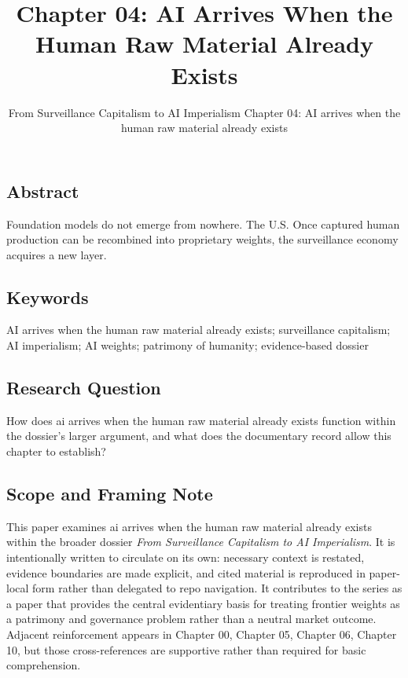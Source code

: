 \documentclass[
  american,
  11pt,
  letterpaper,
]{article}
\title{Chapter 04: AI Arrives When the Human Raw Material Already
Exists}
\subtitle{From Surveillance Capitalism to AI Imperialism \textbar{}
Chapter 04: AI arrives when the human raw material already exists}
\author{}
\date{}
\begin{document}
\maketitle

\subsection{Abstract}\label{abstract}

Foundation models do not emerge from nowhere. The U.S. Once captured
human production can be recombined into proprietary weights, the
surveillance economy acquires a new layer.

\subsection{Keywords}\label{keywords}

AI arrives when the human raw material already exists; surveillance
capitalism; AI imperialism; AI weights; patrimony of humanity;
evidence-based dossier

\subsection{Research Question}\label{research-question}

How does ai arrives when the human raw material already exists function
within the dossier's larger argument, and what does the documentary
record allow this chapter to establish?

\subsection{Scope and Framing Note}\label{scope-and-framing-note}

This paper examines ai arrives when the human raw material already
exists within the broader dossier \emph{From Surveillance Capitalism to
AI Imperialism}. It is intentionally written to circulate on its own:
necessary context is restated, evidence boundaries are made explicit,
and cited material is reproduced in paper-local form rather than
delegated to repo navigation. It contributes to the series as a paper
that provides the central evidentiary basis for treating frontier
weights as a patrimony and governance problem rather than a neutral
market outcome. Adjacent reinforcement appears in Chapter 00, Chapter
05, Chapter 06, Chapter 10, but those cross-references are supportive
rather than required for basic comprehension.
\end{document}
